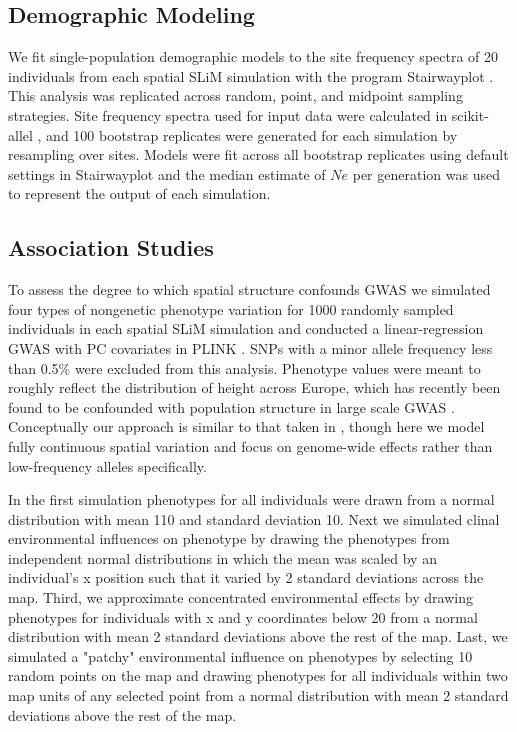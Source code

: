 \documentclass[9pt,twocolumn,twoside,lineno]{gsajnl}
\begin{document}
\subsection{Demographic Modeling}
We fit single-population demographic models to the site frequency spectra of 20 individuals from each spatial SLiM simulation with the program Stairwayplot \citep{Liu2015}. This analysis was replicated across random, point, and midpoint sampling strategies. Site frequency spectra used for input data were calculated in scikit-allel \citep{Miles2017}, and 100 bootstrap replicates were generated for each simulation by resampling over sites. Models were fit across all bootstrap replicates using default settings in Stairwayplot and the median estimate of $Ne$ per generation was used to represent the output of each simulation.

\subsection{Association Studies}
To assess the degree to which spatial structure confounds GWAS we simulated four types of nongenetic phenotype variation for 1000 randomly sampled individuals in each spatial SLiM simulation and conducted a linear-regression GWAS with PC covariates in PLINK \citep{PURCELL2007}. SNPs with a minor allele frequency less than 0.5\% were excluded from this analysis. Phenotype values were meant to roughly reflect the distribution of height across Europe, which has recently been found to be confounded with population structure in large scale GWAS \citep{Berg2018,Sohail2018}. Conceptually our approach is similar to that taken in \citep{Mathieson2012}, though here we model fully continuous spatial variation and focus on genome-wide effects rather than low-frequency alleles specifically. 

In the first simulation phenotypes for all individuals were drawn from a normal distribution with mean 110 and standard deviation 10. Next we simulated clinal environmental influences on phenotype by drawing the phenotypes from independent normal distributions in which the mean was scaled by an individual's x position such that it varied by 2 standard deviations across the map. Third, we approximate concentrated environmental effects by drawing phenotypes for individuals with x and y coordinates below 20 from a normal distribution with mean 2 standard deviations above the rest of the map. Last, we simulated a "patchy" environmental influence on phenotypes by selecting 10 random points on the map and drawing phenotypes for all individuals within two map units of any selected point from a normal distribution with mean 2 standard deviations above the rest of the map. 
\end{document}
